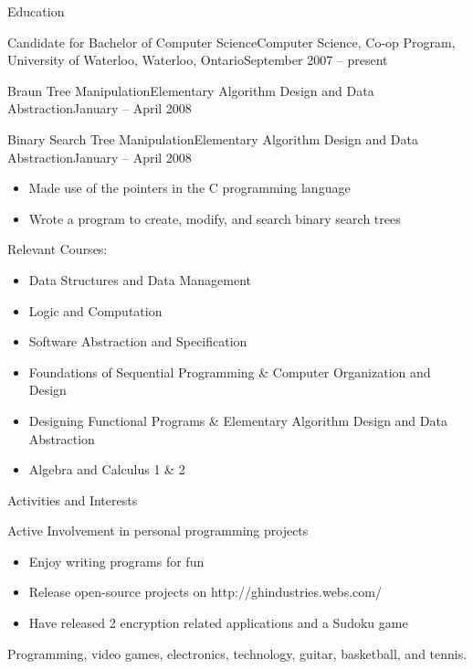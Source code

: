 \documentclass[11pt]{article}
\begin{document}
\begin{section}{Education}
\begin{subsection}{Candidate for Bachelor of Computer Science}{Computer Science, Co-op Program, University of Waterloo, Waterloo, Ontario}{September 2007 -- present}
\begin{indent}
\begin{subsection}{Braun Tree Manipulation}{Elementary Algorithm Design and Data Abstraction}{January -- April 2008}
				\end{subsection}
				
				\begin{subsection}{Binary Search Tree Manipulation}{Elementary Algorithm Design and Data Abstraction}{January -- April 2008}
				
					\begin{itemize}
						\item Made use of the pointers in the C programming language
						\item Wrote a program to create, modify, and search binary search trees
					\end{itemize}
					
				\end{subsection}
				
				\begin{bf}Relevant Courses:\end{bf}
				
				\begin{itemize}
					\item Data Structures and Data Management
					\item Logic and Computation
					\item Software Abstraction and Specification
					\item Foundations of Sequential Programming \& Computer Organization and Design
					\item Designing Functional Programs \& Elementary Algorithm Design and Data Abstraction
					\item Algebra and Calculus 1 \& 2
				\end{itemize}
			\end{indent}
			
		\end{subsection}
			
	\end{section}
	
	\begin{section}{Activities and Interests} \\
	
		\begin{bf}Active Involvement in personal programming projects\end{bf}
		
		\begin{itemize}
			\item Enjoy writing programs for fun
			\item Release open-source projects on http://ghindustries.webs.com/
			\item Have released 2 encryption related applications and a Sudoku game
		\end{itemize}
		
		Programming, video games, electronics, technology, guitar, basketball, and tennis.
		
	\end{section}
\end{document}
